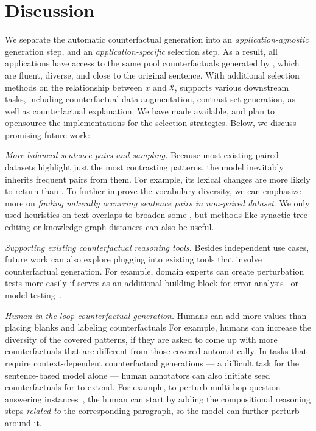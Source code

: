 \section{Discussion}
\label{sec:discuss}

We separate the automatic counterfactual generation into an \emph{application-agnostic} generation step, and an \emph{application-specific} selection step.
As a result, all applications have access to the same pool counterfactuals generated by \sysname, which are fluent, diverse, and close to the original sentence.
With additional selection methods on the relationship between $x$ and $\hat{x}$, \sysname supports various downstream tasks, including counterfactual data augmentation, contrast set generation, as well as counterfactual explanation.
We have made \sysname available, and plan to opensource the implementations for the selection strategies.
Below, we discuss promising future work:


\emph{More balanced sentence pairs and sampling.}
Because most existing paired datasets highlight just the most contrasting patterns, the \sysname model inevitably inherits frequent pairs from them.
For example, its lexical changes are more likely to return  than .
To further improve the vocabulary diversity, we can emphasize more on \emph{finding naturally occurring sentence pairs in non-paired dataset}. 
We only used heuristics on text overlaps to broaden some \tagstrs, but methods like synactic tree editing or knowledge graph distances can also be useful.

\emph{Supporting existing counterfactual reasoning tools.}
Besides independent use cases, future work can also explore plugging \sysname into existing tools that involve counterfactual generation.
For example, domain experts can create perturbation tests more easily if \sysname serves as an additional building block for error analysis~\cite{wu2019errudite} or model testing~\cite{checklist:acl20}.


\emph{Human-in-the-loop counterfactual generation.}
Humans can add more values than placing blanks and labeling counterfactuals
For example, humans can increase the diversity of the covered patterns, if they are asked to come up with more counterfactuals that are different from those covered automatically.
In tasks that require context-dependent counterfactual generations --- a difficult task for the sentence-based model alone --- human annotators can also initiate seed counterfactuals for \sysname to extend.
For example, to perturb multi-hop question answering instances~\cite{gardner2020contrast}, the human can start by adding the compositional reasoning steps \emph{related to} the corresponding paragraph, so the model can further perturb around it.